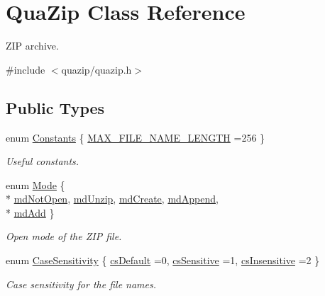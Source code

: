 \hypertarget{class_qua_zip}{\section{Qua\-Zip Class Reference}
\label{class_qua_zip}
}


Z\-I\-P archive.  




{\ttfamily \#include $<$quazip/quazip.\-h$>$}

\subsection*{Public Types}
\begin{DoxyCompactItemize}
\item 
enum \hyperlink{class_qua_zip_adce46b942c341dbb5c851eadead65459}{Constants} \{ \hyperlink{class_qua_zip_adce46b942c341dbb5c851eadead65459ab26ce1a9c9e94f901dc2cf90fa5baa4b}{M\-A\-X\-\_\-\-F\-I\-L\-E\-\_\-\-N\-A\-M\-E\-\_\-\-L\-E\-N\-G\-T\-H} =256
 \}
\begin{DoxyCompactList}\small\item\em Useful constants. \end{DoxyCompactList}\item 
enum \hyperlink{class_qua_zip_a47e28d4116ee716fdd6b431b821d0be4}{Mode} \{ \\*
\hyperlink{class_qua_zip_a47e28d4116ee716fdd6b431b821d0be4ac87ddb1e901e1ec700c16ee0d4d398ce}{md\-Not\-Open}, 
\hyperlink{class_qua_zip_a47e28d4116ee716fdd6b431b821d0be4a803a371910c2dc830d111e9ce5b58897}{md\-Unzip}, 
\hyperlink{class_qua_zip_a47e28d4116ee716fdd6b431b821d0be4a25ae05b12590540af8c66ae8298b928e}{md\-Create}, 
\hyperlink{class_qua_zip_a47e28d4116ee716fdd6b431b821d0be4ab807f0c65653a16d77b365801fd25582}{md\-Append}, 
\\*
\hyperlink{class_qua_zip_a47e28d4116ee716fdd6b431b821d0be4a22c745f349f06add449af523254fdaec}{md\-Add}
 \}
\begin{DoxyCompactList}\small\item\em Open mode of the Z\-I\-P file. \end{DoxyCompactList}\item 
enum \hyperlink{class_qua_zip_a6053a1d249ed210a85c9d5eb7cf9cdbe}{Case\-Sensitivity} \{ \hyperlink{class_qua_zip_a6053a1d249ed210a85c9d5eb7cf9cdbeac3cca8c0b976cf6397a28a5c84e75253}{cs\-Default} =0, 
\hyperlink{class_qua_zip_a6053a1d249ed210a85c9d5eb7cf9cdbead8d86b0c34203336cad09348cfa5356e}{cs\-Sensitive} =1, 
\hyperlink{class_qua_zip_a6053a1d249ed210a85c9d5eb7cf9cdbea3e492bcc3f64f41a74906cecc45fb366}{cs\-Insensitive} =2
 \}
\begin{DoxyCompactList}\small\item\em Case sensitivity for the file names. \end{DoxyCompactList}\end{DoxyCompactItemize}
